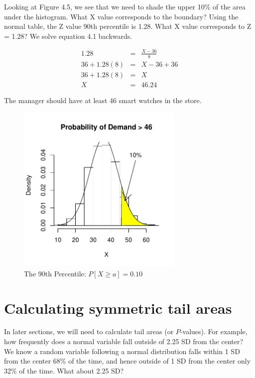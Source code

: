 \documentclass[11pt, chapterprefix=true]{scrbook}\usepackage[]{graphicx}\usepackage[]{color}
\begin{document}
Looking at Figure 4.5, we see that we need to shade the upper 10\% of the area under the histogram.  What X value corresponds to the boundary?  Using the normal table, the Z value 90th percentile is 1.28.  What X value corresponds to Z = 1.28?  We solve equation 4.1 backwards.

\begin{eqnarray*}
1.28 & = & \frac{X - 36}{8}  \\
36 + 1.28(8) & = & X-36 + 36 \\
36 + 1.28(8) & = & X \\
X & = & 46.24
\end{eqnarray*}

The manager should have at least 46 smart watches in the store.

\begin{figure}[ht]
\caption{The 90th Percentile: $P[X \ge a] = 0.10$ }


{\centering \includegraphics[width=8cm]{figure/LBL4e-1} 

}



\end{figure}

\section{Calculating symmetric tail areas}

In later sections, we will need to calculate tail areas (or $P$-values).  For example, how frequently does a normal variable fall outside of 2.25 SD from the center?  We know a random variable following a normal distribution falls within 1 SD from the center 68\% of the time, and hence outside of 1 SD from the center only 32\% of the time.  What about 2.25 SD?
\end{document}
